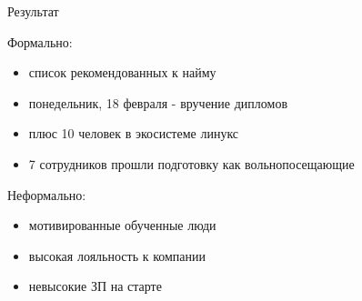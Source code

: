 \begin{frame}{Результат}
  \begin{center}
    \large 
    \alert{Формально}:
    \begin{itemize}
      \item список рекомендованных к найму 
      \item понедельник, 18 февраля - вручение дипломов  
      \item плюс 10 человек в экосистеме линукс
      \item 7 сотрудников прошли подготовку как вольнопосещающие
    \end{itemize} \pause

    \alert{Неформально}:
    \begin{itemize}
      \item мотивированные обученные люди 
      \item высокая лояльность к компании
      \item невысокие ЗП на старте
    \end{itemize}
  \end{center}
\end{frame}
